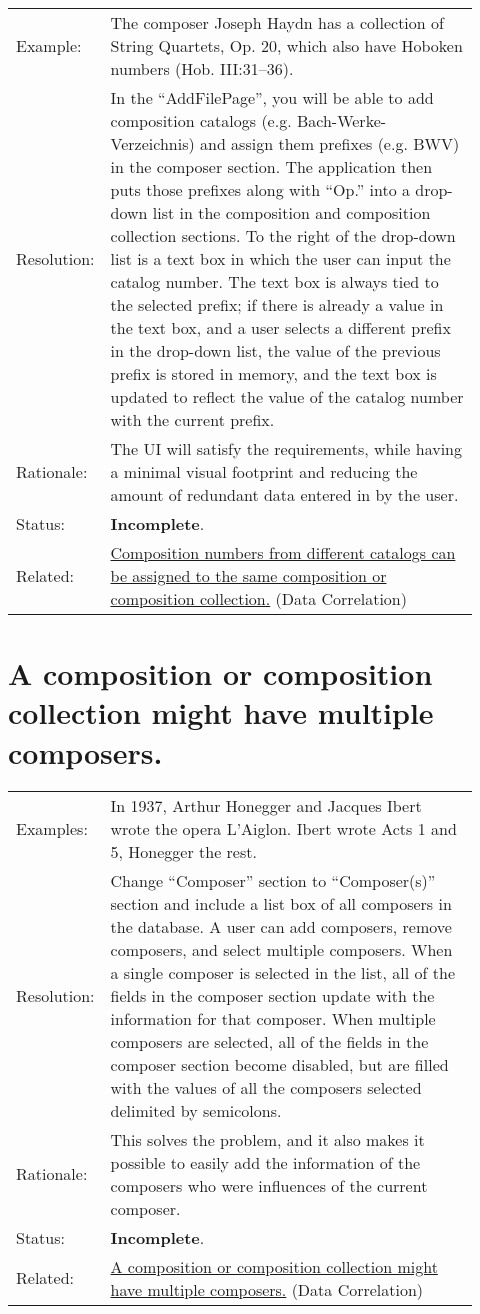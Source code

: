 \documentclass[letterpaper]{report}
\begin{document}
\begin{tabular}{ p{0.1\linewidth} p{0.825\linewidth} }
  Example: & The composer Joseph Haydn has a collection of String Quartets, Op. 20, which also have Hoboken numbers (Hob. III:31--36). \\ 
  Resolution: & In the ``AddFilePage'', you will be able to add composition catalogs (e.g. Bach-Werke-Verzeichnis) and assign them prefixes (e.g. BWV) in the composer section. The application then puts those prefixes along with ``Op.'' into a drop-down list in the composition and composition collection sections. To the right of the drop-down list is a text box in which the user can input the catalog number. The text box is always tied to the selected prefix; if there is already a value in the text box, and a user selects a different prefix in the drop-down list, the value of the previous prefix is stored in memory, and the text box is updated to reflect the value of the catalog number with the current prefix. \\
  Rationale: & The UI will satisfy the requirements, while having a minimal visual footprint and reducing the amount of redundant data entered in by the user. \\
  Status: & \textbf{Incomplete}. \\
  Related: & \hyperref[D.2]{Composition numbers from different catalogs can be assigned to the same composition or composition collection.} (Data Correlation)
\end{tabular}

\section{A composition or composition collection might have multiple composers.}
\label{UI.3}

\begin{tabular}{ p{0.1\linewidth} p{0.825\linewidth} }
  Examples: & In 1937, Arthur Honegger and Jacques Ibert wrote the opera L'Aiglon. Ibert wrote Acts 1 and 5, Honegger the rest. \\ 
  Resolution: & Change ``Composer'' section to ``Composer(s)'' section and include a list box of all composers in the database. A user can add composers, remove composers, and select multiple composers. When a single composer is selected in the list, all of the fields in the composer section update with the information for that composer. When multiple composers are selected, all of the fields in the composer section become disabled, but are filled with the values of all the composers selected delimited by semicolons.  \\
  Rationale: & This solves the problem, and it also makes it possible to easily add the information of the composers who were influences of the current composer. \\
  Status: & \textbf{Incomplete}. \\
  Related: & \hyperref[D.6]{A composition or composition collection might have multiple composers.} (Data Correlation)
\end{tabular}
\end{document}

